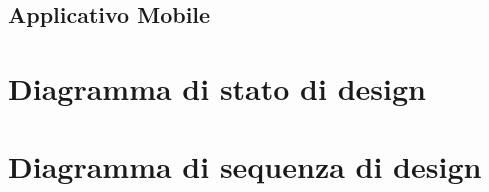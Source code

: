 \subsection{Applicativo Mobile}
    
    
    
\section{Diagramma di stato di design}

\section{Diagramma di sequenza di design}